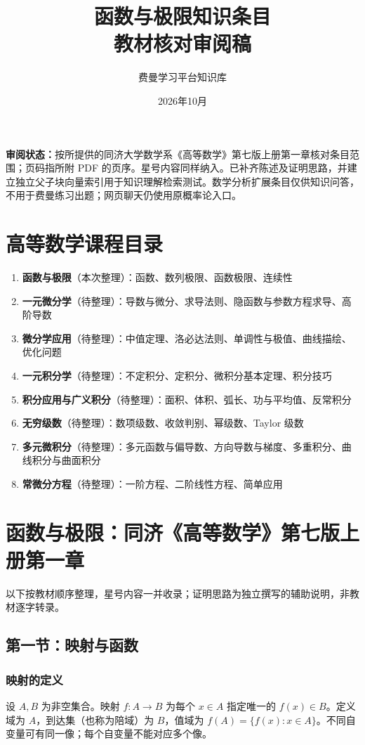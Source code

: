 \documentclass[UTF8,11pt,a4paper]{ctexart}
\title{函数与极限知识条目\\教材核对审阅稿}
\author{费曼学习平台知识库}
\date{2026年10月}
\begin{document}
\maketitle
\noindent\textbf{审阅状态：}按所提供的同济大学数学系《高等数学》第七版上册第一章核对条目范围；页码指所附 PDF 的页序。星号内容同样纳入。已补齐陈述及证明思路，并建立独立父子块向量索引用于知识理解检索测试。数学分析扩展条目仅供知识问答，不用于费曼练习出题；网页聊天仍使用原概率论入口。
\tableofcontents
\newpage
\section{高等数学课程目录}
\begin{enumerate}
\item \textbf{函数与极限}（本次整理）：函数、数列极限、函数极限、连续性
\item \textbf{一元微分学}（待整理）：导数与微分、求导法则、隐函数与参数方程求导、高阶导数
\item \textbf{微分学应用}（待整理）：中值定理、洛必达法则、单调性与极值、曲线描绘、优化问题
\item \textbf{一元积分学}（待整理）：不定积分、定积分、微积分基本定理、积分技巧
\item \textbf{积分应用与广义积分}（待整理）：面积、体积、弧长、功与平均值、反常积分
\item \textbf{无穷级数}（待整理）：数项级数、收敛判别、幂级数、Taylor 级数
\item \textbf{多元微积分}（待整理）：多元函数与偏导数、方向导数与梯度、多重积分、曲线积分与曲面积分
\item \textbf{常微分方程}（待整理）：一阶方程、二阶线性方程、简单应用
\end{enumerate}
\section{函数与极限：同济《高等数学》第七版上册第一章}
以下按教材顺序整理，星号内容一并收录；证明思路为独立撰写的辅助说明，非教材逐字转录。
\subsection{第一节：映射与函数}
\subsubsection{映射的定义}
设 $A,B$ 为非空集合。映射 $f:A\to B$ 为每个 $x\in A$ 指定唯一的 $f(x)\in B$。定义域为 $A$，到达集（也称为陪域）为 $B$，值域为 $f(A)=\{f(x):x\in A\}$。不同自变量可有同一像；每个自变量不能对应多个像。
\end{document}
